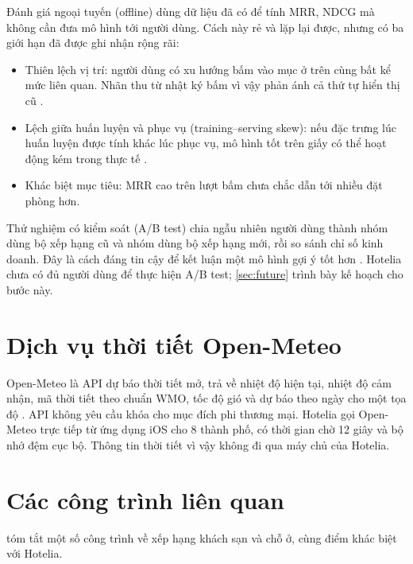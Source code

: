 Đánh giá ngoại tuyến (offline) dùng dữ liệu đã có để tính MRR, NDCG mà không cần đưa mô hình tới người dùng. Cách này rẻ và lặp lại được, nhưng có ba giới hạn đã được ghi nhận rộng rãi:
\begin{itemize}
\item Thiên lệch vị trí: người dùng có xu hướng bấm vào mục ở trên cùng bất kể mức liên quan. Nhãn thu từ nhật ký bấm vì vậy phản ánh cả thứ tự hiển thị cũ \cite{joachims2017}.
\item Lệch giữa huấn luyện và phục vụ (training--serving skew): nếu đặc trưng lúc huấn luyện được tính khác lúc phục vụ, mô hình tốt trên giấy có thể hoạt động kém trong thực tế \cite{sculley2015}.
\item Khác biệt mục tiêu: MRR cao trên lượt bấm chưa chắc dẫn tới nhiều đặt phòng hơn.
\end{itemize}
Thử nghiệm có kiểm soát (A/B test) chia ngẫu nhiên người dùng thành nhóm dùng bộ xếp hạng cũ và nhóm dùng bộ xếp hạng mới, rồi so sánh chỉ số kinh doanh. Đây là cách đáng tin cậy để kết luận một mô hình gợi ý tốt hơn \cite{kohavi2009}. Hotelia chưa có đủ người dùng để thực hiện A/B test; \cref{sec:future} trình bày kế hoạch cho bước này.

\section{Dịch vụ thời tiết Open-Meteo}

Open-Meteo là API dự báo thời tiết mở, trả về nhiệt độ hiện tại, nhiệt độ cảm nhận, mã thời tiết theo chuẩn WMO, tốc độ gió và dự báo theo ngày cho một tọa độ \cite{openmeteo}. API không yêu cầu khóa cho mục đích phi thương mại. Hotelia gọi Open-Meteo trực tiếp từ ứng dụng iOS cho 8 thành phố, có thời gian chờ 12 giây và bộ nhớ đệm cục bộ. Thông tin thời tiết vì vậy không đi qua máy chủ của Hotelia.

\section{Các công trình liên quan}\label{sec:related}

 tóm tắt một số công trình về xếp hạng khách sạn và chỗ ở, cùng điểm khác biệt với Hotelia.

